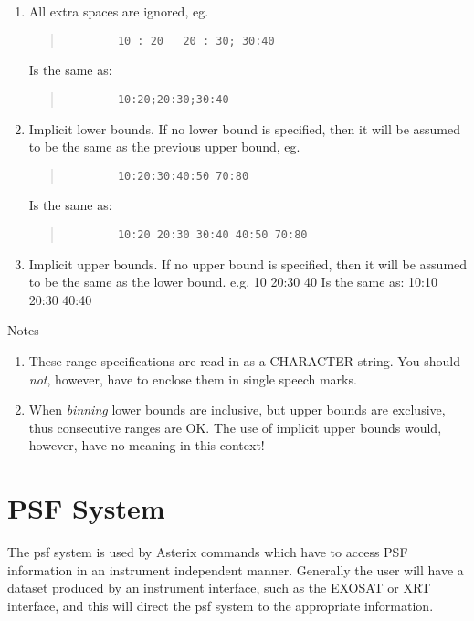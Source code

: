\documentclass{book}
\renewcommand{\_}{{\tt\char'137}}     %
\begin{document}
\begin{itemize}
\begin{enumerate}
\item All extra spaces are ignored, eg.
\begin{quote}\begin{verbatim}
        10 : 20   20 : 30; 30:40
        \end{verbatim}\end{quote}
Is the same as:
\begin{quote}\begin{verbatim}
        10:20;20:30;30:40
        \end{verbatim}\end{quote}
\item Implicit lower bounds. If no lower bound is specified,
then it will be assumed to be the same as the previous
upper bound, eg.

\begin{quote}\begin{verbatim}
        10:20:30:40:50 70:80
        \end{verbatim}\end{quote}
Is the same as:
\begin{quote}\begin{verbatim}
        10:20 20:30 30:40 40:50 70:80
        \end{verbatim}\end{quote}
\item Implicit upper bounds. If no upper bound is specified,
then it will be assumed to be the same as the lower
bound.
e.g.
10 20:30 40
Is the same as:
10:10 20:30 40:40
\end{enumerate}
\end{itemize}
Notes


\begin{enumerate}
\item These range specifications are read in as a CHARACTER
string. You should {\em not}, however, have to enclose them in
single speech marks.
\item When {\em binning} lower bounds are inclusive, but upper
bounds are exclusive, thus consecutive ranges are OK.
The use of implicit upper bounds would, however, have no
meaning in this context!
\end{enumerate}
\section{PSF System}
The psf system is used by Asterix commands which have to access
PSF information in an instrument independent manner. Generally
the user will have a dataset produced by an instrument interface,
such as the EXOSAT or XRT interface, and this will direct the psf
system to the appropriate information.
\end{document}
